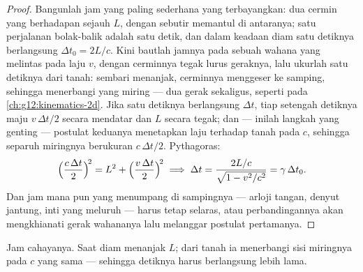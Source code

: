 \begin{proof}
Bangunlah jam yang paling sederhana yang terbayangkan: dua cermin yang berhadapan sejauh $L$,
dengan sebutir  memantul di antaranya; satu perjalanan bolak-balik adalah satu detik, dan dalam
keadaan diam satu detiknya berlangsung $\Delta t_0 = 2L/c$. Kini bautlah jamnya pada sebuah wahana
yang melintas pada laju $v$, dengan cerminnya tegak lurus geraknya, lalu ukurlah satu
detiknya dari tanah: sembari  menanjak, cerminnya menggeser ke samping,
sehingga  menerbangi  yang miring --- dua gerak sekaligus, seperti
 pada \cref{ch:g12:kinematics-2d}. Jika satu detiknya berlangsung $\Delta t$,
tiap setengah detiknya maju $v\,\Delta t/2$ secara mendatar dan $L$ secara tegak; dan ---
inilah langkah yang genting --- postulat keduanya menetapkan laju  terhadap tanah pada
$c$, sehingga separuh  miringnya berukuran $c\,\Delta t/2$. Pythagoras:
\[
\Bigl(\frac{c\,\Delta t}{2}\Bigr)^{\!2} = L^2 + \Bigl(\frac{v\,\Delta t}{2}\Bigr)^{\!2}
\;\Longrightarrow\;
\Delta t = \frac{2L/c}{\sqrt{1 - v^2/c^2}} = \gamma\,\Delta t_0 .
\]
Dan jam mana pun yang menumpang di sampingnya --- arloji tangan, denyut jantung, inti yang meluruh ---
harus tetap selaras, atau perbandingannya akan mengkhianati gerak wahananya lalu melanggar
postulat pertamanya.
\end{proof}

\begin{omfigure}
\qquad
{}

{\small Jam cahayanya. Saat diam  menanjak $L$; dari tanah ia
menerbangi sisi miringnya pada $c$ yang sama --- sehingga detiknya harus berlangsung lebih lama.}
\end{omfigure}

